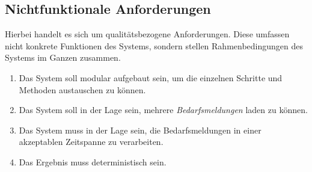 \subsection{Nichtfunktionale Anforderungen}
Hierbei handelt es sich um qualitätsbezogene Anforderungen. Diese umfassen nicht konkrete Funktionen des Systems, sondern stellen Rahmenbedingungen des Systems im Ganzen zusammen.
\begin{enumerate}
	\item Das System soll modular aufgebaut sein, um die einzelnen Schritte und Methoden austauschen zu können.
	\item Das System soll in der Lage sein, mehrere \emph{Bedarfsmeldungen} laden zu können.
	\item Das System muss in der Lage sein, die Bedarfsmeldungen in einer akzeptablen Zeitspanne zu verarbeiten.
	\item Das Ergebnis muss deterministisch sein.
\end{enumerate}
